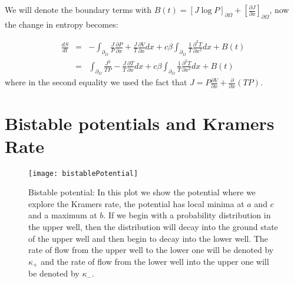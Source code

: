We will denote the boundary terms with $B(t) =  [J \log P]_{\partial \Omega} + [\frac{\partial J}{\partial x}]_{\partial \Omega}$, now the change in entropy becomes:

\begin{eqnarray}
\frac{d S}{d t} & = & - \int_{\partial_\Omega} \frac{J}{P} \frac{\partial P}{\partial x} + \frac{J}{T} \frac{\partial V}{\partial x} dx +  c \beta \int_{\partial_\Omega} \frac{1}{T} \frac{\partial^2 T}{\partial x^2} dx + B(t) \\
                    & = & \int_{\partial_\Omega} \frac{J^2}{T P} - \frac{J}{T} \frac{\partial T}{\partial x} dx + c \beta \int_{\partial_\Omega} \frac{1}{T} \frac{\partial^2 T}{\partial x^2} dx + B(t)
\end{eqnarray}
where in the second equality we used the fact that $J = P \frac{\partial V}{\partial x} + \frac{\partial}{\partial x} (TP)$.

\section{Bistable potentials and Kramers Rate}

\begin{figure}[tb]
\texttt{[image: bistablePotential]}
\caption{Bistable potential: In this plot we show the potential where we explore the Kramers rate, the potential has local minima at $a$ and $c$ and a maximum at $b$. If we begin with a probability distribution in the upper well, then the distribution will decay into the ground state of the upper well and then begin to decay into the lower well. The rate of flow from the upper well to the lower one will be denoted by $\kappa_+$ and the rate of flow from the lower well into the upper one will be denoted by $\kappa_-$.}
\label{fig:bistablePotential}
\end{figure}

